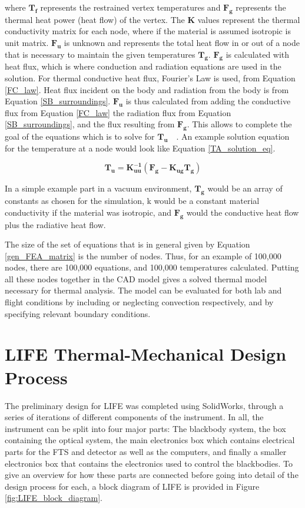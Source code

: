 where $\bm{T_f}$ represents the restrained vertex temperatures and $\bm{F_g}$ represents the thermal heat power (heat flow) of the vertex. The $\bm{K}$ values represent the thermal conductivity matrix for each node, where if the material is assumed isotropic is unit matrix. $\bm{F_u}$ is unknown and represents the total heat flow in or out of a node that is necessary to maintain the given temperatures $\bm{T_g}$. $\bm{F_g}$ is calculated with heat flux, which is where conduction and radiation equations are used in the solution. For thermal conductive heat flux, Fourier's Law is used, from Equation \ref{FC_law}. Heat flux incident on the body and radiation from the body is from Equation \ref{SB_surroundings}. $\bm{F_u}$ is thus calculated from adding the conductive flux from Equation \ref{FC_law} the radiation flux from Equation \ref{SB_surroundings}, and the flux resulting from $\bm{F_g}$. This allows to complete the goal of the equations which is to solve for $\bm{T_u}$~\citep{FEA_SW}~\citep{FEA_Procedures}. An example solution equation for the temperature at a node would look like Equation \ref{TA_solution_eq}.

\begin{equation}\label{TA_solution_eq}
    \bm{T_u = K_{uu}^{-1}(F_g-K_{ug}T_g)}
\end{equation}

In a simple example part in a vacuum environment, $\bm{T_g}$ would be an array of constants as chosen for the simulation, k would be a constant material conductivity if the material was isotropic, and $\bm{F_g}$ would the conductive heat flow plus the radiative heat flow. 

The size of the set of equations that is in general given by Equation \ref{gen_FEA_matrix} is the number of nodes. Thus, for an example of 100,000 nodes, there are 100,000 equations, and 100,000 temperatures calculated. Putting all these nodes together in the CAD model gives a solved thermal model necessary for thermal analysis.  The model can be evaluated for both lab and flight conditions by including or neglecting convection respectively, and by specifying relevant boundary conditions. 

\section{LIFE Thermal-Mechanical Design Process}\label{prelim_design}
The preliminary design for LIFE was completed using SolidWorks, through a series of iterations of different components of the instrument. In all, the instrument can be split into four major parts: The blackbody system, the box containing the optical system, the main electronics box which contains electrical parts for the FTS and detector as well as the computers, and finally a smaller electronics box that contains the electronics used to control the blackbodies. To give an overview for how these parts are connected before going into detail of the design process for each, a block diagram of LIFE is provided in Figure \ref{fig:LIFE_block_diagram}.

